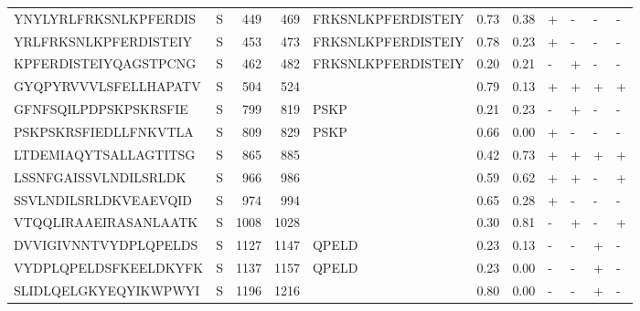 \begin{tabular}{llrrlrrllll}
YNYLYRLFRKSNLKPFERDIS &       S &    449 &   469 &  FRKSNLKPFERDISTEIY &            0.73 &             0.38 &      + &       - &      - &       - \\
YRLFRKSNLKPFERDISTEIY &       S &    453 &   473 &  FRKSNLKPFERDISTEIY &            0.78 &             0.23 &      + &       - &      - &       - \\
KPFERDISTEIYQAGSTPCNG &       S &    462 &   482 &  FRKSNLKPFERDISTEIY &            0.20 &             0.21 &      - &       + &      - &       - \\
GYQPYRVVVLSFELLHAPATV &       S &    504 &   524 &                     &            0.79 &             0.13 &      + &       + &      + &       + \\
GFNFSQILPDPSKPSKRSFIE &       S &    799 &   819 &                PSKP &            0.21 &             0.23 &      - &       + &      - &       - \\
PSKPSKRSFIEDLLFNKVTLA &       S &    809 &   829 &                PSKP &            0.66 &             0.00 &      + &       - &      - &       - \\
LTDEMIAQYTSALLAGTITSG &       S &    865 &   885 &                     &            0.42 &             0.73 &      + &       + &      + &       + \\
LSSNFGAISSVLNDILSRLDK &       S &    966 &   986 &                     &            0.59 &             0.62 &      + &       + &      - &       + \\
SSVLNDILSRLDKVEAEVQID &       S &    974 &   994 &                     &            0.65 &             0.28 &      + &       - &      - &       - \\
VTQQLIRAAEIRASANLAATK &       S &   1008 &  1028 &                     &            0.30 &             0.81 &      - &       + &      - &       + \\
DVVIGIVNNTVYDPLQPELDS &       S &   1127 &  1147 &               QPELD &            0.23 &             0.13 &      - &       - &      + &       - \\
VYDPLQPELDSFKEELDKYFK &       S &   1137 &  1157 &               QPELD &            0.23 &             0.00 &      - &       - &      + &       - \\
SLIDLQELGKYEQYIKWPWYI &       S &   1196 &  1216 &                     &            0.80 &             0.00 &      - &       - &      + &       - \\
\bottomrule
\end{tabular}
